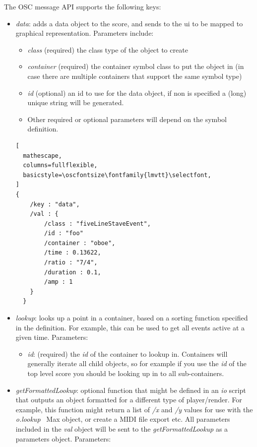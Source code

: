 \documentclass{article}
\def\oscfontsize{\footnotesize}
\begin{document}
The OSC message API supports the following keys:
\begin{itemize}\itemsep0pt 
\item \textit{data}: adds a data object to the score, and sends to the ui to be mapped to graphical representation. Parameters include:
\begin{itemize}\itemsep0pt 
  \item \textit{class} (required) the class type of the object to create
  \item \textit{container} (required) the container symbol class to put the object in (in case there are multiple containers that support the same symbol type)
  \item \textit{id} (optional) an id to use for the data object, if non is specified a (long) unique string will be generated.
  \item Other required or optional parameters will depend on the symbol definition.
\end{itemize}

\begin{lstlisting}[
  mathescape,
  columns=fullflexible,
  basicstyle=\oscfontsize\fontfamily{lmvtt}\selectfont,
]
{
    /key : "data",
    /val : {
        /class : "fiveLineStaveEvent",
        /id : "foo"
        /container : "oboe",
	    /time : 0.13622,
	    /ratio : "7/4",
	    /duration : 0.1,
	    /amp : 1
    }
  }
\end{lstlisting}


\item \textit{lookup}: looks up a point in a container, based on a sorting function specified in the definition. For example, this can be used to get all events active at a given time. Parameters:

\begin{itemize}\itemsep0pt 
  \item \textit{id}: (required) the \textit{id} of the container to lookup in. Containers will generally iterate all child objects, so for example if you use the \textit{id} of the top level score you should be looking up in to all sub-containers.
  \end{itemize}
  
\item \textit{getFormattedLookup}: optional function that might be defined in an \textit{io} script that outputs an object formatted for a different type of player/render. For example, this function might return a list of \textit{/x} and \textit{/y} values for use with the \textit{o.lookup~} Max object, or create a MIDI file export etc. All parameters included in the \textit{val} object will be sent to the \textit{getFormattedLookup} as a parameters object. Parameters:


\end{itemize}
\end{document}
